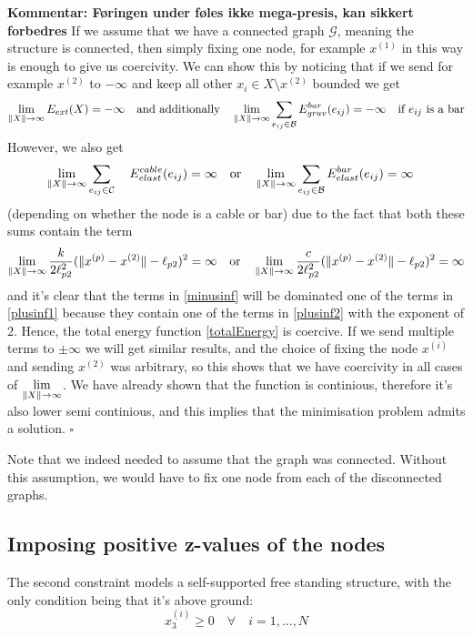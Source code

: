 \textbf{Kommentar: Føringen under føles ikke mega-presis, kan sikkert forbedres}
If we assume that we have a connected graph $\mathcal{G}$, meaning the structure is connected, then simply fixing one node, for example $x^{(1)}$ in this way is enough to give us coercivity. We can show this by noticing that if we send for example $x^{(2)}$ to $-\infty$ and keep all other $x_i \in X \setminus x^{(2)}$ bounded we get
\begin{equation}
  \lim\limits_{\rVert X \lVert \to \infty} E_{ext}(X) = -\infty
\quad\text{and additionally}\quad
\lim\limits_{\rVert X \lVert \to \infty} \sum\limits_{e_{ij} \in \mathcal{B}} E^{bar}_{grav}(e_{ij}) = -\infty \quad \text{if $e_{ij}$ is a bar}
\label{minusinf}
\end{equation}
However, we also get
\begin{equation}
     \lim\limits_{\rVert X \lVert \to \infty} \sum\limits_{e_{ij} \in \mathcal{C}}\quad E^{cable}_{elast}(e_{ij}) = \infty \quad \text{or}\quad \lim\limits_{\rVert X \lVert \to \infty} \sum\limits_{e_{ij} \in \mathcal{B }}E^{bar}_{elast}(e_{ij}) = \infty \quad
     \label{plusinf1}
\end{equation} (depending on whether the node is a cable or bar)
due to the fact that both these sums contain the term \begin{equation}
 \lim\limits_{\rVert X \lVert \to \infty} \frac{k}{2 \ell_{p2}^2}(\lVert x^{(p)} - x^{(2)} \rVert-\ell_{p2})^2 = \infty \quad \text{or} \quad \lim\limits_{\rVert X \lVert \to \infty} \frac{c}{2 \ell_{p2}^2}(\lVert x^{(p)} - x^{(2)} \rVert-\ell_{p2})^2 = \infty
 \label{plusinf2}
\end{equation}
and it's clear that the terms in \eqref{minusinf} will be dominated one of the terms in \eqref{plusinf1} because they contain one of the terms in \eqref{plusinf2} with the exponent of $2$. Hence, the total energy function \eqref{totalEnergy} is coercive. If we send multiple terms to $\pm \infty$ we will get similar results, and the choice of fixing the node $x^{(i)}$ and sending $x^{(2)}$ was arbitrary, so this shows that we have coercivity in all cases of $\lim\limits_{\rVert X \lVert \to \infty}$. We have already shown that the function is continious, therefore it's also lower semi continious, and this implies that the minimisation problem admits a solution. $\square$

Note that we indeed needed to assume that the graph was connected. Without this assumption, we would have to fix one node from each of the disconnected graphs.

\subsection{Imposing positive z-values of the nodes}
The second constraint models a self-supported free standing structure, with the only condition being that it's above ground:
\begin{equation}
    x_3^{(i)} \geq 0 \quad \forall \quad i = 1,...,N
\end{equation}

